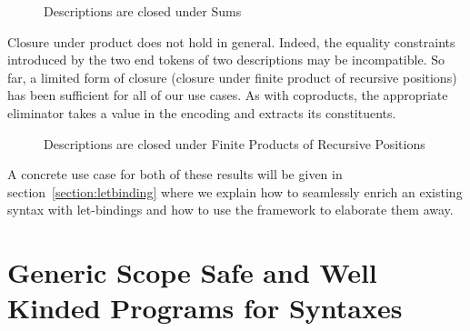 \begin{figure}[h]
\begin{minipage}{0.45\textwidth}
\end{minipage}\hspace{2em}
\begin{minipage}{0.45\textwidth}
\end{minipage}
\caption{Descriptions are closed under Sums}
\end{figure}

Closure under product does not hold in general. Indeed, the
equality constraints introduced by the two end tokens of two
descriptions may be incompatible. So far, a limited form of
closure (closure under finite product of recursive positions)
has been sufficient for all of our use cases. As with coproducts,
the appropriate eliminator  takes a value in the encoding
and extracts its constituents.

\begin{figure}[h]
\begin{minipage}{0.45\textwidth}
\end{minipage}\hspace{2em}
\begin{minipage}{0.45\textwidth}
\end{minipage}
\caption{Descriptions are closed under Finite Products of Recursive Positions}
\end{figure}

A concrete use case for both of these results will be given in section~\ref{section:letbinding}
where we explain how to seamlessly enrich an existing syntax with let-bindings
and how to use the  framework to elaborate them away.




\section{Generic Scope Safe and Well Kinded Programs for Syntaxes}\label{section:semantics}

